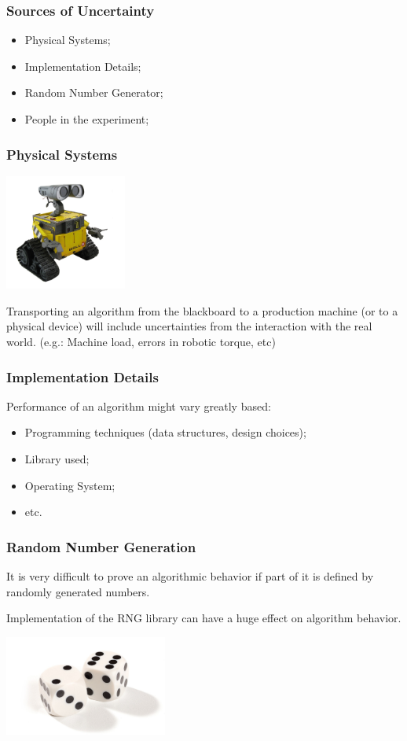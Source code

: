 \documentclass{beamer}
\begin{document}
\begin{frame}
  \frametitle{Sources of Uncertainty}
  \begin{itemize}
  \item Physical Systems;
  \item Implementation Details;
  \item Random Number Generator;
  \item People in the experiment;
  \end{itemize}
\end{frame}

\begin{frame}
  \frametitle{Physical Systems}
  \includegraphics[width=0.3\textwidth]{img/robot}
  \begin{block}{}
    Transporting an algorithm from the blackboard to a production
    machine (or to a physical device) will include uncertainties from
    the interaction with the real world.
    \medskip
    (e.g.: Machine load, errors in robotic torque, etc)
  \end{block}
\end{frame}

\begin{frame}
  \frametitle{Implementation Details}
  \begin{block}{}
    Performance of an algorithm might vary greatly based:
    \begin{itemize}
    \item Programming techniques (data structures, design choices);
    \item Library used;
    \item Operating System;
    \item etc.
    \end{itemize}
  \end{block}
\end{frame}

\begin{frame}
  \frametitle{Random Number Generation}
  \begin{block}{}
    It is very difficult to prove an algorithmic behavior if part of
    it is defined by randomly generated numbers.
    \medskip
    
    Implementation of the RNG library can have a huge effect on
    algorithm behavior.
  \end{block}

  \hfill
  \includegraphics[width=0.4\textwidth]{img/dice}
\end{frame}
\end{document}
